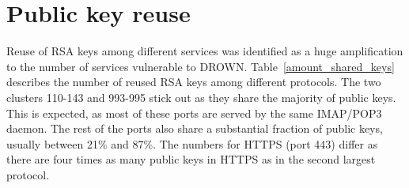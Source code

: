 %
%

\appendix
\section{Public key reuse}
\label{sec:pub_key_reuse}

Reuse of RSA keys among different services was identified as a huge
amplification to the number of services vulnerable to DROWN\@.
Table~\ref{amount_shared_keys} describes the number of reused RSA keys among
different protocols. The two clusters 110-143 and 993-995 stick out as they
share the majority of public keys. This is expected, as most of these ports
are served by the same IMAP/POP3 daemon. The rest of the ports also share a
substantial fraction of public keys, usually between 21\% and 87\%. The
numbers for HTTPS (port 443) differ as there are four times as many public
keys in HTTPS as in the second largest protocol.

